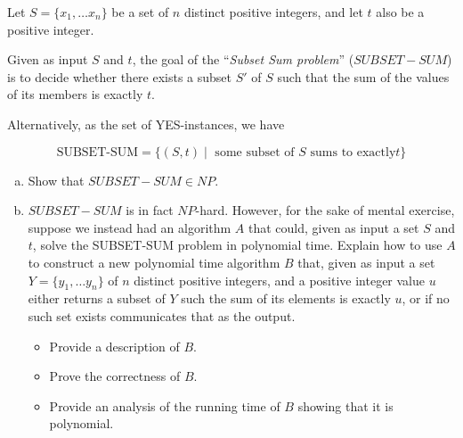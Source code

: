 \documentclass{cs0500}
\begin{document}
\begin{problem}
Let $S= \{ x_1, \ldots x_n \}$ be a set of $n$ distinct positive integers, and let $t$ also be a positive integer.  

Given as input $S$ and $t$, the goal of the ``\emph{Subset Sum problem}'' ($SUBSET-SUM$) is to decide whether there exists a subset $S'$ of $S$ such that the sum of the values of its members is exactly $t$. 

Alternatively, as the set of YES-instances, we have

\[ \mbox{SUBSET-SUM}  = \{ (S,t) \mid \mbox{ some subset of $S$ sums to exactly
$t$}  \} 
\]
\begin{enumerate}[(a)]
    \item Show that $SUBSET-SUM \in NP$.
    \item $SUBSET-SUM$ is in fact $NP$-hard. However, for the sake of mental exercise, suppose we instead had an algorithm $A$ that could, given as input a set $S$ and $t$, solve the SUBSET-SUM problem in polynomial time. Explain how to use $A$ to construct a new polynomial time algorithm $B$ that, given as input a set $Y=\{ y_1, \ldots y_n \}$ of $n$ distinct positive integers, and a positive integer value $u$  either returns a subset of $Y$ such the sum of its elements is exactly $u$, or if no such set exists communicates that as the output.
    \begin{itemize}
        \item Provide a description of $B$.
        \item Prove the correctness of $B$.
        \item Provide an analysis of the running time of $B$ showing that it is polynomial.
    \end{itemize}
\end{enumerate}
\end{problem}
\begin{solution}
\end{solution}
\end{document}
